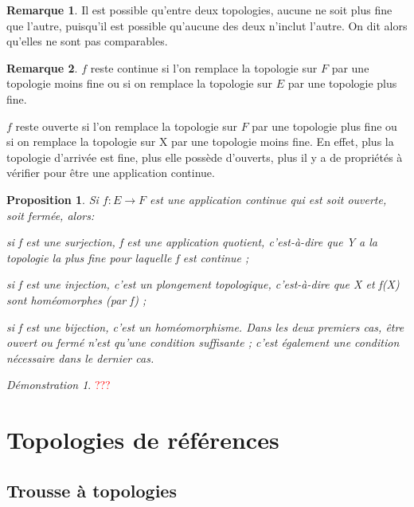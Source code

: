 \documentclass[a4paper, 11pt, french]{book}
\newenvironment{itemise}{\itemize}{\enditemize}
\theoremstyle{plain} %
\newtheorem{proposition}{Proposition}
\theoremstyle{definition} %
\newtheorem{remarque}{Remarque}
\theoremstyle{remark} %
\newtheorem*{demonstration}{Démonstration}
\newcommand{\1}{\mathds{1}}
\begin{document}
\begin{remarque}
	Il est possible qu'entre deux topologies, aucune ne soit plus fine que l'autre, puisqu'il est possible qu'aucune des deux n'inclut l'autre.
	On dit alors qu'elles ne sont pas comparables.
\end{remarque}

\begin{remarque} 
	\text{}
	\begin{itemise}
		\item $f$ reste continue si l'on remplace la topologie sur $F$ par une topologie moins fine ou si on remplace la topologie sur $E$ par une topologie plus fine.
		\item $f$ reste ouverte si l'on remplace la topologie sur $F$ par une topologie plus fine ou si on remplace la topologie sur X par une topologie moins fine.
	\end{itemise}
	En effet, plus la topologie d'arrivée est fine, plus elle possède d'ouverts, plus il y a de propriétés à vérifier pour être une application continue.
\end{remarque}

\begin{proposition}
	Si $f\colon E\rightarrow F$ est une application continue qui est soit ouverte, soit fermée, alors:
	\begin{itemise}
		\item si f est une surjection, f est une application quotient, c'est-à-dire que Y a la topologie la plus fine pour laquelle f est continue ;
		\item si f est une injection, c'est un plongement topologique, c'est-à-dire que X et f(X) sont homéomorphes (par f) ;
		\item si f est une bijection, c'est un homéomorphisme.
	\end{itemise}
	Dans les deux premiers cas, être ouvert ou fermé n'est qu'une condition suffisante ; c'est également une condition nécessaire dans le dernier cas.
\end{proposition}

\begin{demonstration}
	\textcolor{red}{???}
\end{demonstration}

\chapter{Topologies de références}

\section{Trousse à topologies}
\end{document}
